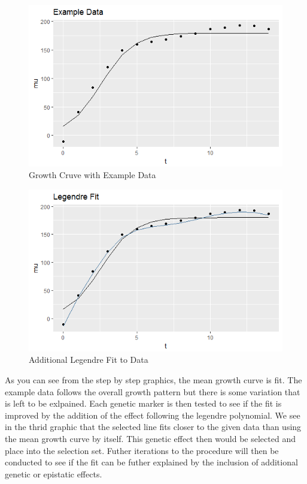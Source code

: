 \documentclass[11pt,]{book}
\theoremstyle{definition}
\theoremstyle{definition}
\theoremstyle{remark}
\begin{document}
\begin{figure}

{\centering \includegraphics[width=0.8\linewidth]{images/ExampleDataGrowthCurve} 

}

\caption{Growth Cruve with Example Data}\label{fig:growth-exampledata}
\end{figure}

\begin{figure}

{\centering \includegraphics[width=0.8\linewidth]{images/LegendreFit} 

}

\caption{Additional Legendre Fit to Data}\label{fig:legendre-fit}
\end{figure}

As you can see from the step by step graphics, the mean growth curve is
fit. The example data follows the overall growth pattern but there is
some variation that is left to be exlpained. Each genetic marker is then
tested to see if the fit is improved by the addition of the effect
following the legendre polynomial. We see in the thrid graphic that the
selected line fits closer to the given data than using the mean growth
curve by itself. This genetic effect then would be selected and place
into the selection set. Futher iterations to the procedure will then be
conducted to see if the fit can be futher explained by the inclusion of
additional genetic or epistatic effects.
\end{document}
